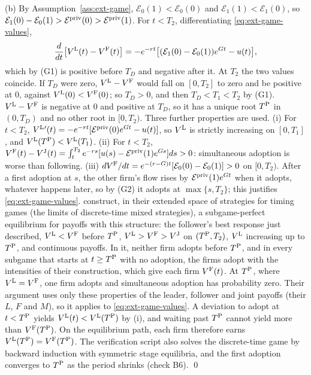 (b) By Assumption~\ref{ass:ext-game}, $\mathcal E_0(1)<\mathcal E_0(0)$ and $\mathcal E_1(1)<\mathcal E_1(0)$, so $\mathcal E_1(0)-\mathcal E_0(1)>\mathcal E^{\rm priv}(0)>\mathcal E^{\rm priv}(1)$. For $t<T_2$, differentiating \eqref{eq:ext-game-values},
\[
\frac{d}{dt}\bigl[V^{\rm L}(t)-V^{\rm F}(t)\bigr]=-e^{-rt}\bigl[(\mathcal E_1(0)-\mathcal E_0(1))e^{Gt}-u(t)\bigr],
\]
which by (G1) is positive before $T_D$ and negative after it. At $T_2$ the two values coincide. If $T_D$ were zero, $V^{\rm L}-V^{\rm F}$ would fall on $[0,T_2]$ to zero and be positive at 0, against $V^{\rm L}(0)<V^{\rm F}(0)$; so $T_D>0$, and then $T_D<T_1<T_2$ by (G1). $V^{\rm L}-V^{\rm F}$ is negative at 0 and positive at $T_D$, so it has a unique root $T^{\rm P}$ in $(0,T_D)$ and no other root in $[0,T_2)$. Three further properties are used. (i) For $t<T_2$, $V^{\rm L}{}'(t)=-e^{-rt}[\mathcal E^{\rm priv}(0)e^{Gt}-u(t)]$, so $V^{\rm L}$ is strictly increasing on $[0,T_1]$, and $V^{\rm L}(T^{\rm P})<V^{\rm L}(T_1)$. (ii) For $t<T_2$, $V^{\rm F}(t)-V^{\rm J}(t)=\int_t^{T_2}e^{-rs}[u(s)-\mathcal E^{\rm priv}(1)e^{Gs}]ds>0$: simultaneous adoption is worse than following. (iii) $dV^{\rm F}/dt=e^{-(r-G)t}[\mathcal E_0(0)-\mathcal E_0(1)]>0$ on $[0,T_2)$. After a first adoption at $s$, the other firm's flow rises by $\mathcal E^{\rm priv}(1)e^{Gt}$ when it adopts, whatever happens later, so by (G2) it adopts at $\max\{s,T_2\}$; this justifies \eqref{eq:ext-game-values}. \citet{fudenberg1985preemption} construct, in their extended space of strategies for timing games (the limits of discrete-time mixed strategies), a subgame-perfect equilibrium for payoffs with this structure: the follower's best response just described, $V^{\rm L}<V^{\rm F}$ before $T^{\rm P}$, $V^{\rm L}>V^{\rm F}>V^{\rm J}$ on $(T^{\rm P},T_2)$, $V^{\rm L}$ increasing up to $T^{\rm P}$, and continuous payoffs. In it, neither firm adopts before $T^{\rm P}$, and in every subgame that starts at $t\ge T^{\rm P}$ with no adoption, the firms adopt with the intensities of their construction, which give each firm $V^{\rm F}(t)$. At $T^{\rm P}$, where $V^{\rm L}=V^{\rm F}$, one firm adopts and simultaneous adoption has probability zero. Their argument uses only these properties of the leader, follower and joint payoffs (their $L$, $F$ and $M$), so it applies to \eqref{eq:ext-game-values}. A deviation to adopt at $t<T^{\rm P}$ yields $V^{\rm L}(t)<V^{\rm L}(T^{\rm P})$ by (i), and waiting past $T^{\rm P}$ cannot yield more than $V^{\rm F}(T^{\rm P})$. On the equilibrium path, each firm therefore earns $V^{\rm L}(T^{\rm P})=V^{\rm F}(T^{\rm P})$. The verification script also solves the discrete-time game by backward induction with symmetric stage equilibria, and the first adoption converges to $T^{\rm P}$ as the period shrinks (check B6). \qed

